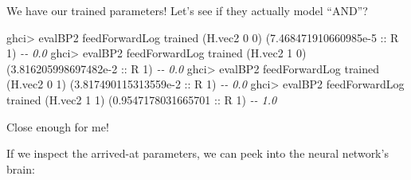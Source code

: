 \documentclass[]{article}
\newenvironment{Shaded}{}{}
\newcommand{\CommentTok}[1]{\textcolor[rgb]{0.38,0.63,0.69}{\textit{#1}}}
\newcommand{\DataTypeTok}[1]{\textcolor[rgb]{0.56,0.13,0.00}{#1}}
\newcommand{\DecValTok}[1]{\textcolor[rgb]{0.25,0.63,0.44}{#1}}
\newcommand{\FloatTok}[1]{\textcolor[rgb]{0.25,0.63,0.44}{#1}}
\newcommand{\FunctionTok}[1]{\textcolor[rgb]{0.02,0.16,0.49}{#1}}
\newcommand{\KeywordTok}[1]{\textcolor[rgb]{0.00,0.44,0.13}{\textbf{#1}}}
\newcommand{\NormalTok}[1]{#1}
\newcommand{\OperatorTok}[1]{\textcolor[rgb]{0.40,0.40,0.40}{#1}}
\newcommand{\OtherTok}[1]{\textcolor[rgb]{0.00,0.44,0.13}{#1}}
\begin{document}
\begin{Shaded}
\end{Shaded}

We have our trained parameters! Let's see if they actually model ``AND''?

\begin{Shaded}
\begin{Highlighting}[]
\NormalTok{ghci}\OperatorTok{\textgreater{}}\NormalTok{ evalBP2 feedForwardLog trained (H.vec2 }\DecValTok{0} \DecValTok{0}\NormalTok{)}
\NormalTok{(}\FloatTok{7.468471910660985e{-}5}\OtherTok{ ::} \DataTypeTok{R} \DecValTok{1}\NormalTok{)       }\CommentTok{{-}{-} 0.0}
\NormalTok{ghci}\OperatorTok{\textgreater{}}\NormalTok{ evalBP2 feedForwardLog trained (H.vec2 }\DecValTok{1} \DecValTok{0}\NormalTok{)}
\NormalTok{(}\FloatTok{3.816205998697482e{-}2}\OtherTok{ ::} \DataTypeTok{R} \DecValTok{1}\NormalTok{)       }\CommentTok{{-}{-} 0.0}
\NormalTok{ghci}\OperatorTok{\textgreater{}}\NormalTok{ evalBP2 feedForwardLog trained (H.vec2 }\DecValTok{0} \DecValTok{1}\NormalTok{)}
\NormalTok{(}\FloatTok{3.817490115313559e{-}2}\OtherTok{ ::} \DataTypeTok{R} \DecValTok{1}\NormalTok{)       }\CommentTok{{-}{-} 0.0}
\NormalTok{ghci}\OperatorTok{\textgreater{}}\NormalTok{ evalBP2 feedForwardLog trained (H.vec2 }\DecValTok{1} \DecValTok{1}\NormalTok{)}
\NormalTok{(}\FloatTok{0.9547178031665701}\OtherTok{ ::} \DataTypeTok{R} \DecValTok{1}\NormalTok{)         }\CommentTok{{-}{-} 1.0}
\end{Highlighting}
\end{Shaded}

Close enough for me!

If we inspect the arrived-at parameters, we can peek into the neural network's
brain:
\end{document}

